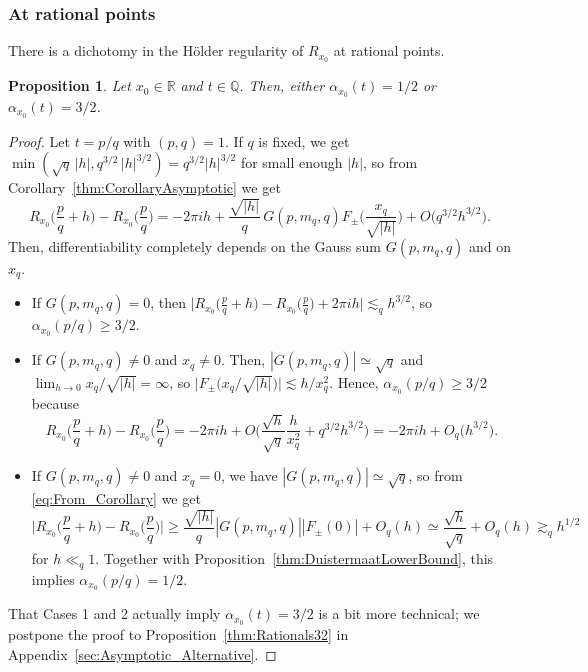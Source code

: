 \documentclass[11pt,reqno]{amsart}
\newtheorem{prop}[thm]{Proposition}
\theoremstyle{definition}
\begin{document}
\subsubsection{At rational points}\label{sec:Lower_Holder_Rationals}
There is a dichotomy in the H\"older regularity of $R_{x_0}$ at rational points. 
\begin{prop}\label{thm:Holder_Lower_Bound_At_Rationals}
Let $x_0 \in \mathbb R$ and $t \in \mathbb Q$. Then, either $\alpha_{x_0}(t) = 1/2$ or $\alpha_{x_0}(t) = 3/2$.  
\end{prop}
\begin{proof}
Let $t = p/q$ with $(p,q)=1$. 
If $q$ is fixed, we get 
$\min \left( \sqrt{q} \, |h| , q^{3/2}\, |h|^{3/2}  \right) = q^{3/2} |h|^{3/2}$ for small enough $|h|$, 
so from Corollary~\ref{thm:CorollaryAsymptotic} we get
\begin{equation}\label{eq:From_Corollary}
 R_{x_0}\Big( \frac{p}{q} + h  \Big)  - R_{x_0}\Big( \frac{p}{q} \Big) = - 2\pi i h + \frac{\sqrt{|h|}}{q} \, G(p,m_q,q) F_\pm \Big( \frac{x_q}{\sqrt{|h|}} \Big) + O\Big( q^{3/2} h^{3/2} \Big). 
\end{equation}
Then, differentiability completely depends on 
the Gauss sum $G(p,m_q,q)$ and on $x_q$.
\begin{itemize}
	\item[\textbf{Case 1}] If $G(p,m_q,q) =0$, then $\big| R_{x_0}\big( \frac{p}{q} + h  \big)  - R_{x_0}\big( \frac{p}{q} \big)  + 2\pi i h \big| \lesssim_q h^{3/2}$, so $\alpha_{x_0}(p/q) \geq 3/2$. 
	\item[\textbf{Case 2}] If $G(p,m_q,q) \neq 0$ and $x_q \neq 0$.
	Then, $|G(p,m_q,q)| \simeq \sqrt{q}$ and $\lim_{h \to 0} x_q/\sqrt{|h|} = \infty$, so $\big| F_\pm \big( x_q/\sqrt{|h|} \big) \big| \lesssim h/x_q^2$. Hence, $\alpha_{x_0}(p/q) \geq 3/2$ because
	\begin{equation}
	 R_{x_0}\Big( \frac{p}{q} + h  \Big)  - R_{x_0}\Big( \frac{p}{q} \Big) = - 2\pi i h + O\Big(   \frac{\sqrt{h}}{\sqrt{q}} \frac{h}{x_q^2} + q^{3/2}h^{3/2} \Big)
	 = - 2\pi i h + O_q\big(  h^{3/2} \big).
	\end{equation}
	
	\item[\textbf{Case 3}] If $G(p,m_q,q) \neq 0$ and $x_q = 0$, 
	we have $|G(p,m_q,q)| \simeq \sqrt{q}$, so from \eqref{eq:From_Corollary} we get
		\begin{equation}
		\Big|   R_{x_0}\Big( \frac{p}{q} + h  \Big)  - R_{x_0}\Big( \frac{p}{q} \Big) \Big| 
		\geq   \frac{\sqrt{|h|}}{q} |G(p,m_q,q)| |F_\pm(0)| + O_q( h )
		\simeq \frac{\sqrt{h}}{\sqrt{q}} + O_q( h )
		\gtrsim_q h^{1/2}
		\end{equation}		  
		for $h \ll_q 1$. Together with Proposition~\ref{thm:DuistermaatLowerBound},
		this implies $\alpha_{x_0}(p/q) = 1/2$. 
\end{itemize}
That Cases 1 and 2 actually imply $\alpha_{x_0}(t) = 3/2$ is a bit more technical; we postpone the proof to Proposition~\ref{thm:Rationals32} in Appendix~\ref{sec:Asymptotic_Alternative}. 
\end{proof}
\end{document}
